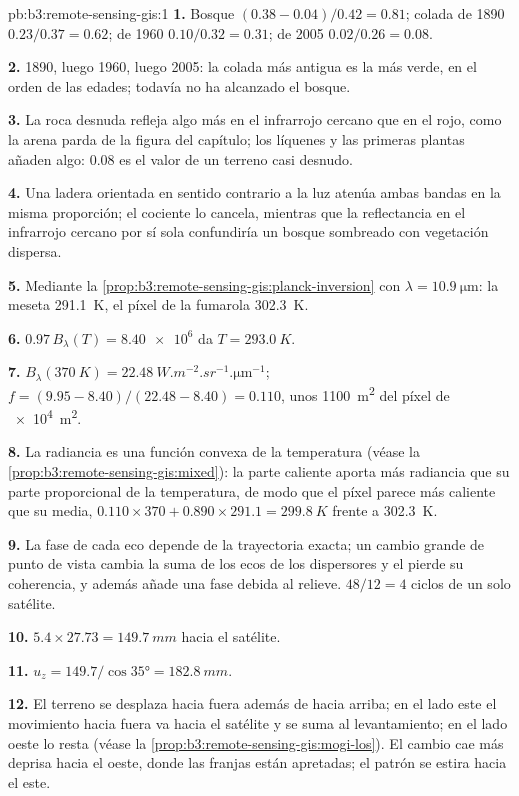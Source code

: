 \begin{solution}{pb:b3:remote-sensing-gis:1}
\textbf{1.} Bosque $(0.38 - 0.04)/0.42 = 0.81$; colada de 1890 $0.23/0.37 =
0.62$; de 1960 $0.10/0.32 = 0.31$; de 2005 $0.02/0.26 = 0.08$.

\textbf{2.} 1890, luego 1960, luego 2005: la colada más antigua es la más verde,
en el orden de las edades; todavía no ha alcanzado el bosque.

\textbf{3.} La roca desnuda refleja algo más en el infrarrojo cercano que en
el rojo, como la arena parda de la figura del capítulo; los líquenes y las primeras
plantas añaden algo: 0.08 es el valor de un terreno casi desnudo.

\textbf{4.} Una ladera orientada en sentido contrario a la luz atenúa ambas bandas en la misma
proporción; el cociente lo cancela, mientras que la reflectancia en el infrarrojo cercano por sí sola
confundiría un bosque sombreado con vegetación dispersa.

\textbf{5.} Mediante la \cref{prop:b3:remote-sensing-gis:planck-inversion} con
$\lambda = \qty{10.9}{\micro\metre}$: la meseta \qty{291.1}{K}, el
píxel de la fumarola \qty{302.3}{K}.

\textbf{6.} $0.97\,B_\lambda(T) = \num{8.40e6}$ da $T = \qty{293.0}{K}$.

\textbf{7.} $B_\lambda(\qty{370}{K}) =
\qty{22.48}{W.m^{-2}.sr^{-1}.\micro\metre^{-1}}$; $f = (9.95 - 8.40)/(22.48
- 8.40) = 0.110$, unos \qty{1100}{m^2} del píxel de \qty{e4}{m^2}.

\textbf{8.} La radiancia es una función convexa de la temperatura
(véase la \cref{prop:b3:remote-sensing-gis:mixed}): la parte caliente aporta más radiancia
que su parte proporcional de la temperatura, de modo que el píxel parece más caliente que su media,
$0.110\times370 + 0.890\times291.1 = \qty{299.8}{K}$ frente a
\qty{302.3}{K}.

\textbf{9.} La fase de cada eco depende de la trayectoria exacta; un cambio grande
de punto de vista cambia la suma de los ecos de los dispersores y el
 pierde su coherencia, y además añade una fase debida al relieve.
$48/12 = 4$ ciclos de un solo satélite.

\textbf{10.} $5.4\times27.73 = \qty{149.7}{mm}$ hacia el satélite.

\textbf{11.} $u_z = 149.7/\cos\ang{35} = \qty{182.8}{mm}$.

\textbf{12.} El terreno se desplaza hacia fuera además de hacia arriba; en el lado este el
movimiento hacia fuera va hacia el satélite y se suma al levantamiento; en el lado oeste
lo resta (véase la \cref{prop:b3:remote-sensing-gis:mogi-los}). El cambio
cae más deprisa hacia el oeste, donde las franjas están apretadas; el patrón
se estira hacia el este.


\end{solution}
